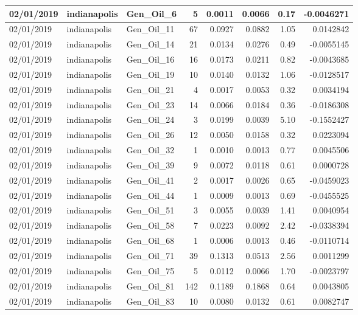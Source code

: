 \documentclass[
  letterpaper,
  DIV=11,
  numbers=noendperiod]{scrartcl}
\begin{document}
\begin{tabular}{l|l|l|r|r|r|r|r}
\hline
02/01/2019 & indianapolis & Gen\_Oil\_6 & 5 & 0.0011 & 0.0066 & 0.17 & -0.0046271\\
\hline
02/01/2019 & indianapolis & Gen\_Oil\_11 & 67 & 0.0927 & 0.0882 & 1.05 & 0.0142842\\
\hline
02/01/2019 & indianapolis & Gen\_Oil\_14 & 21 & 0.0134 & 0.0276 & 0.49 & -0.0055145\\
\hline
02/01/2019 & indianapolis & Gen\_Oil\_16 & 16 & 0.0173 & 0.0211 & 0.82 & -0.0043685\\
\hline
02/01/2019 & indianapolis & Gen\_Oil\_19 & 10 & 0.0140 & 0.0132 & 1.06 & -0.0128517\\
\hline
02/01/2019 & indianapolis & Gen\_Oil\_21 & 4 & 0.0017 & 0.0053 & 0.32 & 0.0034194\\
\hline
02/01/2019 & indianapolis & Gen\_Oil\_23 & 14 & 0.0066 & 0.0184 & 0.36 & -0.0186308\\
\hline
02/01/2019 & indianapolis & Gen\_Oil\_24 & 3 & 0.0199 & 0.0039 & 5.10 & -0.1552427\\
\hline
02/01/2019 & indianapolis & Gen\_Oil\_26 & 12 & 0.0050 & 0.0158 & 0.32 & 0.0223094\\
\hline
02/01/2019 & indianapolis & Gen\_Oil\_32 & 1 & 0.0010 & 0.0013 & 0.77 & 0.0045506\\
\hline
02/01/2019 & indianapolis & Gen\_Oil\_39 & 9 & 0.0072 & 0.0118 & 0.61 & 0.0000728\\
\hline
02/01/2019 & indianapolis & Gen\_Oil\_41 & 2 & 0.0017 & 0.0026 & 0.65 & -0.0459023\\
\hline
02/01/2019 & indianapolis & Gen\_Oil\_44 & 1 & 0.0009 & 0.0013 & 0.69 & -0.0455525\\
\hline
02/01/2019 & indianapolis & Gen\_Oil\_51 & 3 & 0.0055 & 0.0039 & 1.41 & 0.0040954\\
\hline
02/01/2019 & indianapolis & Gen\_Oil\_58 & 7 & 0.0223 & 0.0092 & 2.42 & -0.0338394\\
\hline
02/01/2019 & indianapolis & Gen\_Oil\_68 & 1 & 0.0006 & 0.0013 & 0.46 & -0.0110714\\
\hline
02/01/2019 & indianapolis & Gen\_Oil\_71 & 39 & 0.1313 & 0.0513 & 2.56 & 0.0011299\\
\hline
02/01/2019 & indianapolis & Gen\_Oil\_75 & 5 & 0.0112 & 0.0066 & 1.70 & -0.0023797\\
\hline
02/01/2019 & indianapolis & Gen\_Oil\_81 & 142 & 0.1189 & 0.1868 & 0.64 & 0.0043805\\
\hline
02/01/2019 & indianapolis & Gen\_Oil\_83 & 10 & 0.0080 & 0.0132 & 0.61 & 0.0082747\\

\end{tabular}
\end{document}
